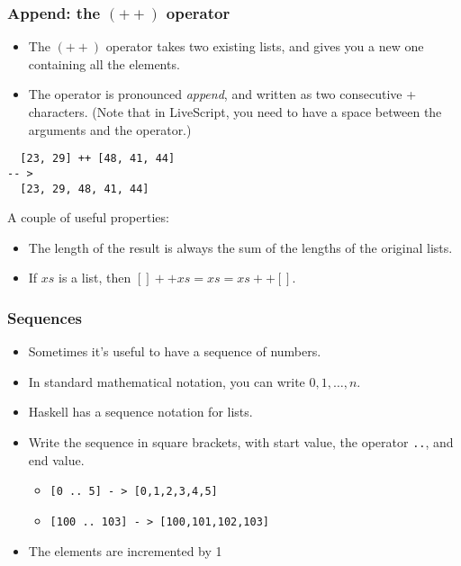 \documentclass{beamer}
\begin{document}
\begin{frame}[fragile]
\frametitle{Append: the $(++)$ operator}

\begin{itemize}
\item The $(++)$ operator  takes two existing lists, and gives
  you a new one containing all the elements.
\item The operator is pronounced \emph{append}, and written as two
  consecutive + characters.
  (Note that in LiveScript, you need to have a space between the arguments and the operator.)
\end{itemize}

\begin{verbatim}
  [23, 29] ++ [48, 41, 44]
-- >
  [23, 29, 48, 41, 44]
\end{verbatim}

A couple of useful properties:

\begin{itemize}
\item The length of the result is always the sum of the lengths of
  the original lists.
\item If $xs$ is a list, then $[] ++ xs = xs = xs ++ []$.
\end{itemize}

\end{frame}

\begin{frame}[fragile]
\frametitle{Sequences}

\begin{itemize}
\item Sometimes it's useful to have a sequence of numbers.
\item In standard mathematical notation, you can write $0, 1,
  \ldots, n$.
\item Haskell has a sequence notation for lists.
\item Write the sequence in square brackets, with start value, the
 operator \texttt{..}, and end value.
  \begin{itemize}
  \item \texttt{[0 .. 5] \-- > [0,1,2,3,4,5]}
  \item \texttt{[100 .. 103] \-- > [100,101,102,103]}
  \end{itemize}
\item The elements are incremented by 1 
\end{itemize}

\end{frame}
\end{document}
